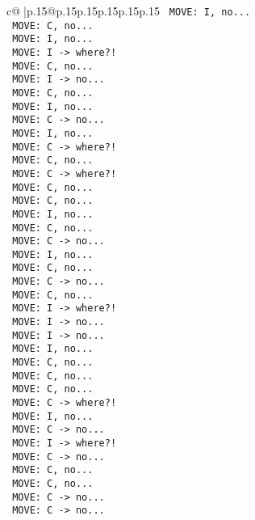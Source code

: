 \documentclass{article}
\begin{document}
{\begin{supertabular}{c@{$\;$}|p{.15\linewidth}@{}p{.15\linewidth}p{.15\linewidth}p{.15\linewidth}p{.15\linewidth}p{.15\linewidth}}
{{{\texttt{ MOVE: I, no...} \\
\texttt{ MOVE: C, no...} \\
\texttt{ MOVE: I, no...} \\
\texttt{ MOVE: I {-}> where?!} \\
\texttt{ MOVE: C, no...} \\
\texttt{ MOVE: I {-}> no...} \\
\texttt{ MOVE: C, no...} \\
\texttt{ MOVE: I, no...} \\
\texttt{ MOVE: C {-}> no...} \\
\texttt{ MOVE: I, no...} \\
\texttt{ MOVE: C {-}> where?!} \\
\texttt{ MOVE: C, no...} \\
\texttt{ MOVE: C {-}> where?!} \\
\texttt{ MOVE: C, no...} \\
\texttt{ MOVE: C, no...} \\
\texttt{ MOVE: I, no...} \\
\texttt{ MOVE: C, no...} \\
\texttt{ MOVE: C {-}> no...} \\
\texttt{ MOVE: I, no...} \\
\texttt{ MOVE: C, no...} \\
\texttt{ MOVE: C {-}> no...} \\
\texttt{ MOVE: C, no...} \\
\texttt{ MOVE: I {-}> where?!} \\
\texttt{ MOVE: I {-}> no...} \\
\texttt{ MOVE: I {-}> no...} \\
\texttt{ MOVE: I, no...} \\
\texttt{ MOVE: C, no...} \\
\texttt{ MOVE: C, no...} \\
\texttt{ MOVE: C, no...} \\
\texttt{ MOVE: C {-}> where?!} \\
\texttt{ MOVE: I, no...} \\
\texttt{ MOVE: C {-}> no...} \\
\texttt{ MOVE: I {-}> where?!} \\
\texttt{ MOVE: C {-}> no...} \\
\texttt{ MOVE: C, no...} \\
\texttt{ MOVE: C, no...} \\
\texttt{ MOVE: C {-}> no...} \\
\texttt{ MOVE: C {-}> no...} \\
}}}
\end{supertabular}}
\end{document}
